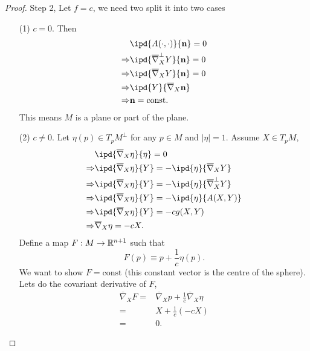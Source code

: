 \begin{proof}
   Step 2, Let $f=c$, we need two split it into two cases
   \begin{itemize}
     \item [(1)] $c=0$. Then 
       \begin{align*}
	 & \ipd{A(\cdot ,\cdot )}{\mathbf{n}}=0\\
	 \Rightarrow & \ipd{\overline{\nabla }^{\perp}_XY}{\mathbf{n}}=0\\
	 \Rightarrow & \ipd{\overline{\nabla }_XY}{\mathbf{n}}=0\\
       \Rightarrow & \ipd{Y}{\overline{\nabla }_X \mathbf{n}}\\
       \Rightarrow & \mathbf{n}=\text{const}
       .\end{align*}
       This means $M$ is a plane or part of the plane.
     \item [(2)] $c\neq 0$. Let $\eta(p) \in T_p M^{\perp}$ for any $p\in M$ and $|\eta|=1$. Assume $X\in T_pM$,
       \begin{align*}
	 & \ipd{\overline{\nabla }_X \eta}{\eta}=0\\
	 \Rightarrow & \ipd{\overline{\nabla }_X\eta}{Y}=-\ipd{\eta}{\overline{\nabla }_XY}\\
	 \Rightarrow & \ipd{\overline{\nabla }_X\eta}{Y}=-\ipd{\eta}{\overline{\nabla }_X^{\perp}Y}\\
	 \Rightarrow & \ipd{\overline{\nabla }_X\eta}{Y}=-\ipd{\eta}{A(X,Y)}\\
	 \Rightarrow& \ipd{\overline{\nabla }_X\eta}{Y}=-c g(X,Y)\\
	 \Rightarrow & \overline{\nabla }_X\eta=-cX
       .\end{align*}
       Define a map $F:M\to \mathbb{R}^{n+1}$ such that 
       \[
	 F(p)\equiv p+ \frac{1}{c}\eta(p).
       \] 
       We want to show $F=\text{const}$ (this constant vector is the centre of the sphere). Lets do the covariant derivative of $F$,
       \begin{align*}
	 \overline{\nabla }_XF=& \overline{\nabla }_X p+\frac{1}{c}\overline{\nabla }_X\eta\\
	 =& X+ \frac{1}{c}(-cX)\\
	 = & 0
       .\end{align*}
   \end{itemize}
\end{proof}

